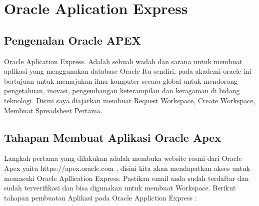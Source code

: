\chapter{Oracle Aplication Express}

\section{Pengenalan Oracle APEX}
Oracle Aplication Express\cite{OracleApex}. Adalah sebuah wadah dan sarana untuk membuat aplikasi yang menggunakan database Oracle Itu sendiri, pada akademi oracle ini bertujuan untuk memajukan ilmu komputer  secara global untuk  mendorong pengetahuan, inovasi, pengembangan keterampilan dan keragaman di bidang teknologi. Disini saya diajarkan membuat Request Workspace, Create Workspace, Membuat Spreadsheet Pertama.

\section{Tahapan Membuat Aplikasi Oracle Apex}
Langkah pertama yang dilakukan adalah membuka website resmi dari Oracle Apex yaitu https://apex.oracle.com , disini kita akan mendapatkan akses untuk memasuki Oracle Apllication Express. Pastikan email anda sudah terdaftar dan sudah terverifikasi dan bisa digunakan untuk membuat Workspace. Berikut tahapan pembuatan Aplikasi pada Oracle Appliction Express :

